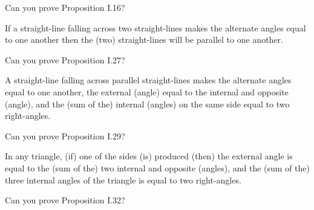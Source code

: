 \documentclass{ximera}
\begin{document}
\begin{question}
Can you prove Proposition I.16?
\end{question}

\begin{proposition}[I.27]
If a straight-line falling across two straight-lines makes the
alternate angles equal to one another then the (two) straight-lines
will be parallel to one another.
\end{proposition}


\begin{question}
Can you prove Proposition I.27?
\end{question}


\begin{proposition}[I.29]
A straight-line falling across parallel straight-lines makes the
alternate angles equal to one another, the external (angle) equal to
the internal and opposite (angle), and the (sum of the) internal
(angles) on the same side equal to two right-angles.
\end{proposition}


\begin{question}
Can you prove Proposition I.29?
\end{question}


\begin{proposition}[I.32]
In any triangle, (if) one of the sides (is) produced (then) the
external angle is equal to the (sum of the) two internal and opposite
(angles), and the (sum of the) three internal angles of the triangle
is equal to two right-angles.
\end{proposition}


\begin{question}
Can you prove Proposition I.32?
\end{question}
\end{document}
